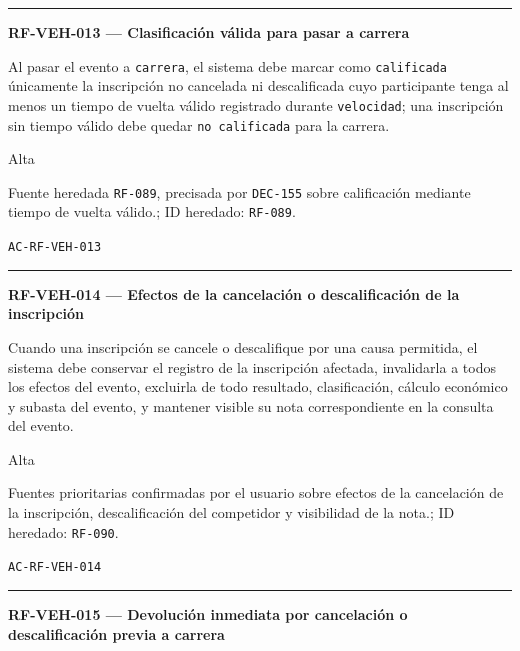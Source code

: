 \documentclass[10pt,letterpaper]{article}
\begin{document}
\vspace{0.25em}\hrule\vspace{0.65em}
\noindent\textbf{RF-VEH-013 --- Clasificación válida para pasar a carrera}\par
\begin{description}[style=nextline,leftmargin=3.15cm,labelwidth=2.8cm,font=\normalfont\bfseries]
\item[Obligación] Al pasar el evento a \texttt{carrera}, el sistema debe marcar como \texttt{calificada} únicamente la inscripción no cancelada ni descalificada cuyo participante tenga al menos un tiempo de vuelta válido registrado durante \texttt{velocidad}; una inscripción sin tiempo válido debe quedar \texttt{no calificada} para la carrera.
\item[Prioridad] Alta
\item[Procedencia] Fuente heredada \texttt{RF-089}, precisada por \texttt{DEC-155} sobre calificación mediante tiempo de vuelta válido.; ID heredado: \texttt{RF-089}.
\item[Verificación] \texttt{AC-RF-VEH-013}
\end{description}
\vspace{0.25em}\hrule\vspace{0.65em}
\noindent\textbf{RF-VEH-014 --- Efectos de la cancelación o descalificación de la inscripción}\par
\begin{description}[style=nextline,leftmargin=3.15cm,labelwidth=2.8cm,font=\normalfont\bfseries]
\item[Obligación] Cuando una inscripción se cancele o descalifique por una causa permitida, el sistema debe conservar el registro de la inscripción afectada, invalidarla a todos los efectos del evento, excluirla de todo resultado, clasificación, cálculo económico y subasta del evento, y mantener visible su nota correspondiente en la consulta del evento.
\item[Prioridad] Alta
\item[Procedencia] Fuentes prioritarias confirmadas por el usuario sobre efectos de la cancelación de la inscripción, descalificación del competidor y visibilidad de la nota.; ID heredado: \texttt{RF-090}.
\item[Verificación] \texttt{AC-RF-VEH-014}
\end{description}
\vspace{0.25em}\hrule\vspace{0.65em}
\noindent\textbf{RF-VEH-015 --- Devolución inmediata por cancelación o descalificación previa a carrera}\par
\end{document}
